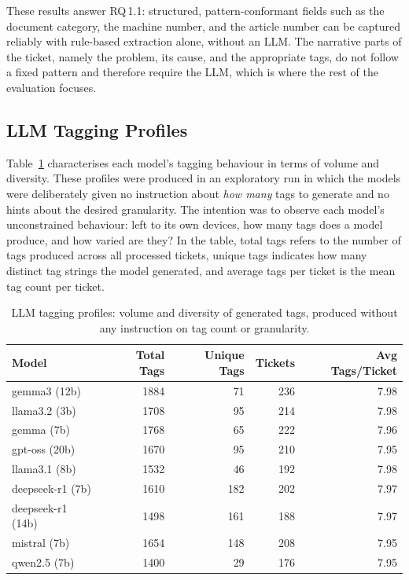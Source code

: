 These results answer RQ\,1.1: structured, pattern-conformant fields such as the
document category, the machine number, and the article number can be captured
reliably with rule-based extraction alone, without an LLM.  The narrative parts
of the ticket, namely the problem, its cause, and the appropriate tags, do not
follow a fixed pattern and therefore require the LLM, which is where the rest of
the evaluation focuses.

\subsection{LLM Tagging Profiles}
\label{subsec:tagging-profiles}
%
Table~\ref{tab:tagging-profiles} characterises each model's tagging behaviour
in terms of volume and diversity.  These profiles were produced in an
exploratory run in which the models were deliberately given no instruction
about \emph{how many} tags to generate and no hints about the desired
granularity.  The intention was to observe each model's unconstrained
behaviour: left to its own devices, how many tags does a model produce, and
how varied are they?  In the table, total tags refers to the number of tags
produced across all processed tickets, unique tags indicates how many distinct
tag strings the model generated, and average tags per ticket is the mean tag
count per ticket.

\begin{table}[H]
    \centering
    \caption[LLM tagging profiles]{LLM tagging profiles: volume and diversity of generated tags, produced without any instruction on tag count or granularity.}
    \label{tab:tagging-profiles}
    \begin{tabular}{lrrrr}
        \hline
        \textbf{Model} & \textbf{Total Tags} & \textbf{Unique Tags} & \textbf{Tickets} & \textbf{Avg Tags/Ticket} \\
        \hline
        gemma3 (12b)      & 1884 &  71 & 236 & 7.98 \\
        llama3.2 (3b)     & 1708 &  95 & 214 & 7.98 \\
        gemma (7b)        & 1768 &  65 & 222 & 7.96 \\
        gpt-oss (20b)     & 1670 &  95 & 210 & 7.95 \\
        llama3.1 (8b)     & 1532 &  46 & 192 & 7.98 \\
        deepseek-r1 (7b)  & 1610 & 182 & 202 & 7.97 \\
        deepseek-r1 (14b) & 1498 & 161 & 188 & 7.97 \\
        mistral (7b)      & 1654 & 148 & 208 & 7.95 \\
        qwen2.5 (7b)      & 1400 &  29 & 176 & 7.95 \\
        \hline
    \end{tabular}
\end{table}

